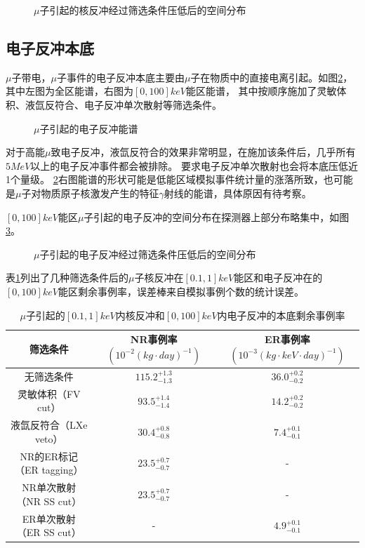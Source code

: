 \begin{figure}
  \centering
  
  \caption{\label{fig:muon_nr_xyzr} $\mu$子引起的核反冲经过筛选条件压低后的空间分布}
\end{figure}

\subsection{电子反冲本底}

$\mu$子带电，$\mu$子事件的电子反冲本底主要由$\mu$子在物质中的直接电离引起。如图\ref{fig:muon_er}，
其中左图为全区能谱，右图为$[0, 100]\si{keV}$能区能谱，
其中按顺序施加了灵敏体积、液氙反符合、电子反冲单次散射等筛选条件。

\begin{figure}
  \centering
  
  \caption{\label{fig:muon_er} $\mu$子引起的电子反冲能谱}
\end{figure}

对于高能$\mu$致电子反冲，液氙反符合的效果非常明显，在施加该条件后，几乎所有$5\si{MeV}$以上的电子反冲事件都会被排除。
要求电子反冲单次散射也会将本底压低近1个量级。
\ref{fig:muon_er}右图能谱的形状可能是低能区域模拟事件统计量的涨落所致，也可能是$\mu$子对物质原子核激发产生的特征$\gamma$射线的能谱，具体原因有待考察。

$[0, 100]\si{keV}$能区$\mu$子引起的电子反冲的空间分布在探测器上部分布略集中，如图\ref{fig:muon_er_xyzr}。

\begin{figure}
  \centering
  
  \caption{\label{fig:muon_er_xyzr} $\mu$子引起的电子反冲经过筛选条件压低后的空间分布}
\end{figure}

表\ref{tab:cuts_muon_remain}列出了几种筛选条件后的$\mu$子核反冲在$[0.1,1]\si{keV}$能区和电子反冲在的$[0,100]\si{keV}$能区剩余事例率，误差棒来自模拟事例个数的统计误差。

\begin{table}
  \centering
  \caption{$\mu$子引起的$[0.1,1]\si{keV}$内核反冲和$[0,100]\si{keV}$内电子反冲的本底剩余事例率}
  \begin{tabular}{ccc}
    \toprule
    筛选条件 & NR事例率$\left(10^{-2}\left(\si{kg}\cdot\si{day}\right)^{-1}\right)$ & ER事例率$\left(10^{-3}\left(\si{kg}\cdot\si{keV}\cdot\si{day}\right)^{-1}\right)$ \\
    \midrule
    无筛选条件 & $115.2_{-1.3}^{+1.3}$ & $36.0_{-0.2}^{+0.2}$ \\
    灵敏体积（FV cut） & $93.5_{-1.4}^{+1.4}$ & $14.2_{-0.2}^{+0.2}$ \\
    液氙反符合（LXe veto） & $30.4_{-0.8}^{+0.8}$ & $7.4_{-0.1}^{+0.1}$ \\
    NR的ER标记（ER tagging） & $23.5_{-0.7}^{+0.7}$ & - \\
    NR单次散射（NR SS cut） & $23.5_{-0.7}^{+0.7}$ & - \\
    ER单次散射（ER SS cut） & - & $4.9_{-0.1}^{+0.1}$ \\
    \bottomrule
  \end{tabular}
  \label{tab:cuts_muon_remain}
\end{table}

